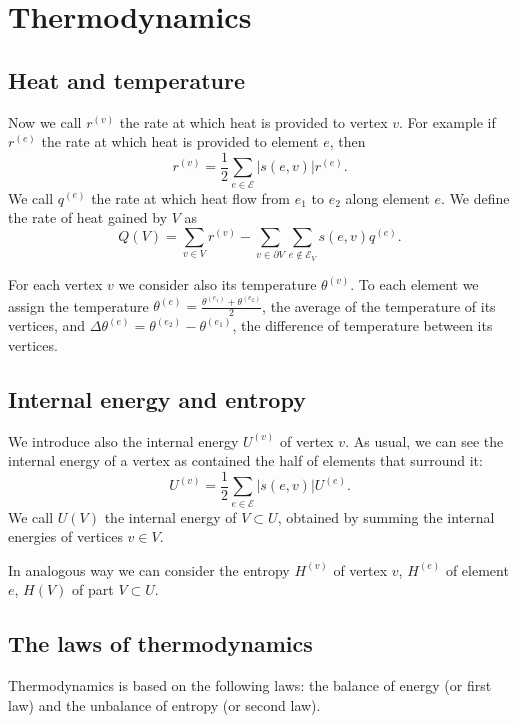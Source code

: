 \documentclass[a4paper,11pt]{article}
\theoremstyle{definition}
\begin{document}
\section{Thermodynamics}

\subsection*{Heat and temperature}

Now we call $r^{(v)}$ the rate at which heat is provided to vertex $v$. For example if $r^{(e)}$ the rate at which heat is provided to element $e$, then
\[
r^{(v)}=\frac{1}{2}\sum_{e\in\mathscr{E}}|s(e,v)|r^{(e)}.
\]
We call $q^{(e)}$ the rate at which heat flow from $e_1$ to $e_2$ along element $e$. We define the rate of heat gained by $V$ as
\[
Q(V)=\sum_{v\in V}r^{(v)}-\sum_{v\in\partial V}\sum_{e\notin\mathscr{E}_V}s(e,v)q^{(e)}.
\]

For each vertex $v$ we consider also its temperature $\theta^{(v)}$. To each element we assign the temperature $\theta^{(e)}=\frac{\theta^{(e_1)}+\theta^{(e_2)}}{2}$, the average of the temperature of its vertices, and $\Delta\theta^{(e)}=\theta^{(e_2)}-\theta^{(e_1)}$, the difference of temperature between its vertices.

\subsection*{Internal energy and entropy}

We introduce also the internal energy $U^{(v)}$ of vertex $v$. As usual, we can see the internal energy of a vertex as contained the half of elements that surround it:
\[
U^{(v)}=\frac{1}{2}\sum_{e\in\mathscr{E}}|s(e,v)|U^{(e)}.
\]
We call $U(V)$ the internal energy of $V\subset U$, obtained by summing the internal energies of vertices $v\in V$.

In analogous way we can consider the entropy $H^{(v)}$ of vertex $v$, $H^{(e)}$ of element $e$, $H(V)$ of part $V\subset U$. 

\subsection*{The laws of thermodynamics}

Thermodynamics is based on the following laws: the balance of energy (or first law) and the unbalance of entropy (or second law).
\end{document}
